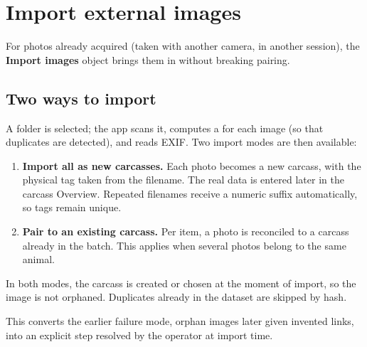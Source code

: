 \chapter{Import external images}


\vspace{4pt}
For photos already acquired (taken with another camera, in another session), the
\textbf{Import images} object brings them in without breaking pairing.

\section{Two ways to import}

A folder is selected; the app scans it, computes a  for each image
(so that duplicates are detected), and reads EXIF. Two import modes are then
available:

\begin{enumerate}[leftmargin=1.4em,itemsep=4pt]
  \item \textbf{Import all as new carcasses.} Each photo becomes a new carcass,
        with the physical tag taken from the filename. The real data is entered
        later in the carcass Overview. Repeated filenames receive a numeric suffix
        automatically, so tags remain unique.
  \item \textbf{Pair to an existing carcass.} Per item, a photo is reconciled to a
        carcass already in the batch. This applies when several photos belong to
        the same animal.
\end{enumerate}

\begin{note}[title=Pairing is preserved either way]
In both modes, the carcass is created or chosen at the moment of import, so the
image is not orphaned. Duplicates already in the dataset are skipped by hash.
\end{note}

This converts the earlier failure mode, orphan images later given invented links,
into an explicit step resolved by the operator at import time.
